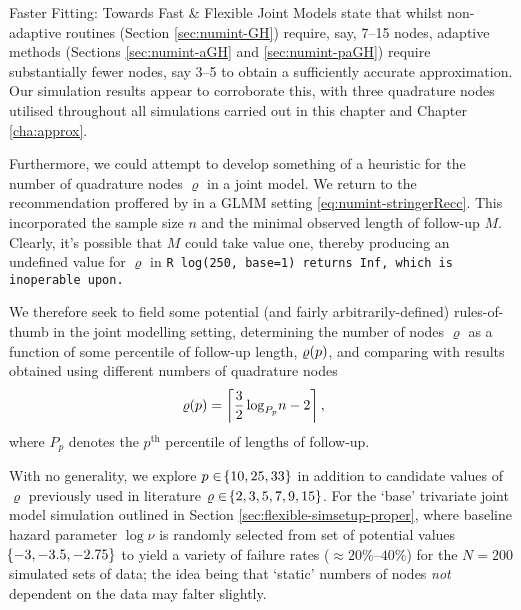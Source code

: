 \begin{chapter}{\label{cha:flexible}Faster Fitting: Towards Fast \& Flexible Joint Models}
\citet{Rizopoulos2012} state that whilst non-adaptive routines (\eg Section \ref{sec:numint-GH}) require, say, 7--15 nodes, adaptive methods (Sections \ref{sec:numint-aGH} and \ref{sec:numint-paGH}) require substantially fewer nodes, say 3--5 to obtain a sufficiently accurate approximation. Our simulation results appear to corroborate this, with three quadrature nodes utilised throughout all simulations carried out in this chapter and Chapter \ref{cha:approx}.

Furthermore, we could attempt to develop something of a heuristic for the number of quadrature nodes $\varrho$ in a joint model. We return to the recommendation proffered by \citet{Stringer2022} in a GLMM setting \eqref{eq:numint-stringerRecc}. This incorporated the sample size $n$ and the minimal observed length of follow-up $M$. Clearly, it's possible that $M$ could take value one, thereby producing an undefined value for $\varrho$ \ie in \tt{R} \tt{log(250, base=1)} returns \tt{Inf}, which is inoperable upon. 

We therefore seek to field some potential (and fairly arbitrarily-defined) rules-of-thumb in the joint modelling setting, determining the number of nodes $\varrho$ as a function of some percentile of follow-up length, $\varrho\!\left( p\right)$, and comparing with results obtained using different numbers of quadrature nodes
\begin{equation}
    \begin{aligned}
        \varrho\!\left( p\right)&=\left\lceil\frac{3}{2}\log_{P_p}\!n-2\right\rceil,
    \end{aligned}
\label{eq:rho-heuristic}
\end{equation}
where $P_p$ denotes the $p^{\mathrm{th}}$ percentile of lengths of follow-up. 

With no generality, we explore $p\in\!\left\{10,25,33\right\}$ in addition to candidate values of $\varrho$ previously used in literature $\varrho\in\!\left\{2,3,5,7,9,15\right\}$. For the `base' trivariate joint model simulation outlined in Section \ref{sec:flexible-simsetup-proper}, where baseline hazard parameter $\log\nu$ is randomly selected from set of potential values $\!\left\{-3,-3.5,-2.75\right\}$ to yield a variety of failure rates ($\approx20\%$--$40\%$) for the $N=200$ simulated sets of data; the idea being that `static' numbers of nodes \textit{not} dependent on the data may falter slightly. 


\end{chapter}
